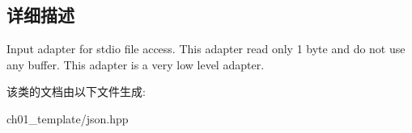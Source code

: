 \subsection{详细描述}
Input adapter for stdio file access. This adapter read only 1 byte and do not use any buffer. This adapter is a very low level adapter. 

该类的文档由以下文件生成\+:\begin{DoxyCompactItemize}
\item 
ch01\+\_\+template/json.\+hpp\end{DoxyCompactItemize}
